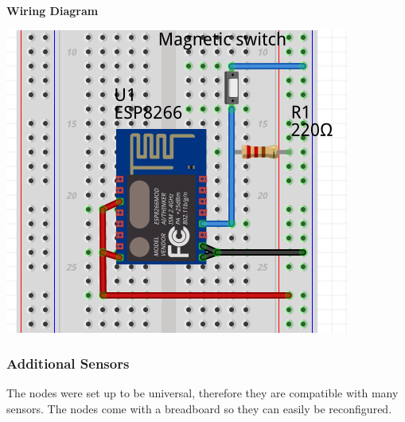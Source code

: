       \textbf{Wiring Diagram}\\
      \begin{center}
        \includegraphics[scale=0.25]{images/door-cir.png}
        \end{center}
    \subsubsection{Additional Sensors}
      The nodes were set up to be universal, therefore they are compatible with
      many sensors. The nodes come with a breadboard so they can
      easily be reconfigured.\\
